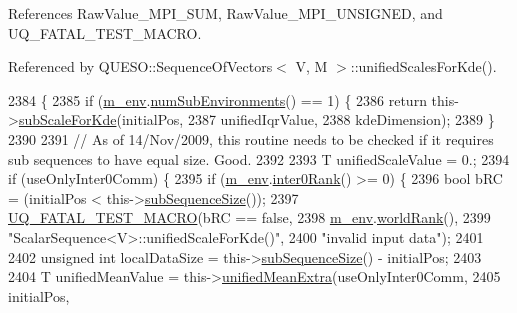 References Raw\-Value\-\_\-\-M\-P\-I\-\_\-\-S\-U\-M, Raw\-Value\-\_\-\-M\-P\-I\-\_\-\-U\-N\-S\-I\-G\-N\-E\-D, and U\-Q\-\_\-\-F\-A\-T\-A\-L\-\_\-\-T\-E\-S\-T\-\_\-\-M\-A\-C\-R\-O.



Referenced by Q\-U\-E\-S\-O\-::\-Sequence\-Of\-Vectors$<$ V, M $>$\-::unified\-Scales\-For\-Kde().


\begin{DoxyCode}
2384 \{
2385   \textcolor{keywordflow}{if} (\hyperlink{class_q_u_e_s_o_1_1_scalar_sequence_a71618cd6351b29361b437af68447a4c8}{m\_env}.\hyperlink{class_q_u_e_s_o_1_1_base_environment_ac0345f57e31ef7833e379ed972bd094d}{numSubEnvironments}() == 1) \{
2386     \textcolor{keywordflow}{return} this->\hyperlink{class_q_u_e_s_o_1_1_scalar_sequence_a4d71b54cc40395677bb744d8b540dad5}{subScaleForKde}(initialPos,
2387                                 unifiedIqrValue,
2388                                 kdeDimension);
2389   \}
2390 
2391   \textcolor{comment}{// As of 14/Nov/2009, this routine needs to be checked if it requires sub sequences to have equal size.
       Good.}
2392 
2393   T unifiedScaleValue = 0.;
2394   \textcolor{keywordflow}{if} (useOnlyInter0Comm) \{
2395     \textcolor{keywordflow}{if} (\hyperlink{class_q_u_e_s_o_1_1_scalar_sequence_a71618cd6351b29361b437af68447a4c8}{m\_env}.\hyperlink{class_q_u_e_s_o_1_1_base_environment_ae106b5bb8a80b655b88b3a26b1e7c185}{inter0Rank}() >= 0) \{
2396       \textcolor{keywordtype}{bool} bRC = (initialPos <  this->\hyperlink{class_q_u_e_s_o_1_1_scalar_sequence_a0288ea295eedc216a1617b3286f6f3a0}{subSequenceSize}());
2397       \hyperlink{_defines_8h_a56d63d18d0a6d45757de47fcc06f574d}{UQ\_FATAL\_TEST\_MACRO}(bRC == \textcolor{keyword}{false},
2398                           \hyperlink{class_q_u_e_s_o_1_1_scalar_sequence_a71618cd6351b29361b437af68447a4c8}{m\_env}.\hyperlink{class_q_u_e_s_o_1_1_base_environment_a78b57112bbd0e6dd0e8afec00b40ffa7}{worldRank}(),
2399                           \textcolor{stringliteral}{"ScalarSequence<V>::unifiedScaleForKde()"},
2400                           \textcolor{stringliteral}{"invalid input data"});
2401 
2402       \textcolor{keywordtype}{unsigned} \textcolor{keywordtype}{int} localDataSize = this->\hyperlink{class_q_u_e_s_o_1_1_scalar_sequence_a0288ea295eedc216a1617b3286f6f3a0}{subSequenceSize}() - initialPos;
2403 
2404       T unifiedMeanValue = this->\hyperlink{class_q_u_e_s_o_1_1_scalar_sequence_ab0b289927919fe9d3a4446ce3433c137}{unifiedMeanExtra}(useOnlyInter0Comm,
2405                                                   initialPos,

\end{DoxyCode}
